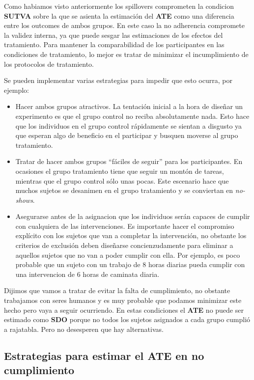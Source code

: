 \documentclass[
  letterpaper,
  DIV=11,
  numbers=noendperiod,
  oneside]{scrreprt}
\begin{document}
Como habiamos visto anteriormente los spillovers comprometen la
condicion \textbf{SUTVA} sobre la que se asienta la estimación del
\textbf{ATE} como una diferencia entre los outcomes de ambos grupos. En
este caso la no adherencia compromete la validez interna, ya que puede
sesgar las estimaciones de los efectos del tratamiento. Para mantener la
comparabilidad de los participantes en las condiciones de tratamiento,
lo mejor es tratar de minimizar el incumplimiento de los protocolos de
tratamiento.

Se pueden implementar varias estrategias para impedir que esto ocurra,
por ejemplo:

\begin{itemize}
\item
  Hacer ambos grupos atractivos. La tentación inicial a la hora de
  diseñar un experimento es que el grupo control no reciba absolutamente
  nada. Esto hace que los individuos en el grupo control rápidamente se
  sientan a disgusto ya que esperan algo de beneficio en el participar y
  busquen moverse al grupo tratamiento.
\item
  Tratar de hacer ambos grupos ``fáciles de seguir'' para los
  participantes. En ocasiones el grupo tratamiento tiene que seguir un
  montón de tareas, mientras que el grupo control sólo unas pocas. Este
  escenario hace que muchos sujetos se desanimen en el grupo tratamiento
  y se conviertan en \emph{no-shows}.
\item
  Asegurarse antes de la asignacion que los individuos serán capaces de
  cumplir con cualquiera de las intervenciones. Es importante hacer el
  compromiso explícito con los sujetos que van a completar la
  intervención, no obstante los criterios de exclusión deben diseñarse
  concienzudamente para eliminar a aquellos sujetos que no van a poder
  cumplir con ella. Por ejemplo, es poco probable que un sujeto con un
  trabajo de \(8\) horas diarias pueda cumplir con una intervencion de
  \(6\) horas de caminata diaria.
\end{itemize}

Dijimos que vamos a tratar de evitar la falta de cumplimiento, no
obstante trabajamos con seres humanos y es muy probable que podamos
minimizar este hecho pero vaya a seguir ocurriendo. En estas condiciones
el \textbf{ATE} no puede ser estimado como \textbf{SDO} porque no todos
los sujetos asignados a cada grupo cumplió a rajatabla. Pero no
desesperen que hay alternativas.

\hypertarget{estrategias-para-estimar-el-ate-en-no-cumplimiento}{%
\subsection{Estrategias para estimar el ATE en no
cumplimiento}\label{estrategias-para-estimar-el-ate-en-no-cumplimiento}}
\end{document}
